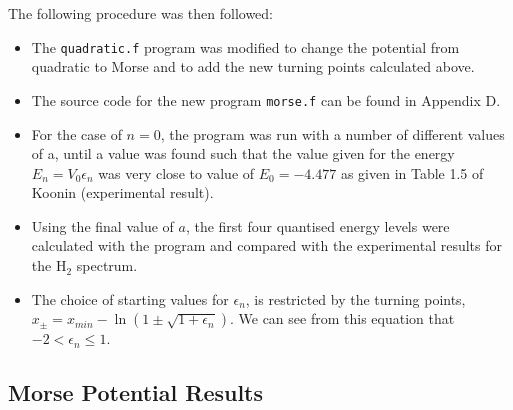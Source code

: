 \documentclass[a4paper]{IEEEtran}
\begin{document}
      The following procedure was then followed:
      \begin{itemize}
            \item The \verb+quadratic.f+ program was modified to change
                  the potential from quadratic to Morse and to add the
                  new turning points calculated above.
            \item The source code for the new program \verb+morse.f+ can
                  be found in Appendix D.
            \item For the case of $n=0$, the program was run with a
                  number of different values of a, until a value was
                  found such that the value given for the energy
                  $E_n = V_0\epsilon_n$ was very close to value of
                  $E_0 = -4.477$ as given in Table 1.5 of Koonin
                  (experimental result).
            \item Using the final value of $a$, the first four quantised
                  energy levels were calculated with the program and
                  compared with the experimental results for the
                  $\mathrm{H_2}$ spectrum.
            \item The choice of starting values for $\epsilon_n$, is
                  restricted by the turning points, \\
                  $x_{\pm}  =  x_{min} - 
                  \ln \left( 1  \pm \sqrt{1+\epsilon_n} \right)$.
                  We can see from this equation that 
                  $-2 < \epsilon_n \le 1$.
      \end{itemize}

\subsection{Morse Potential Results}
\end{document}
